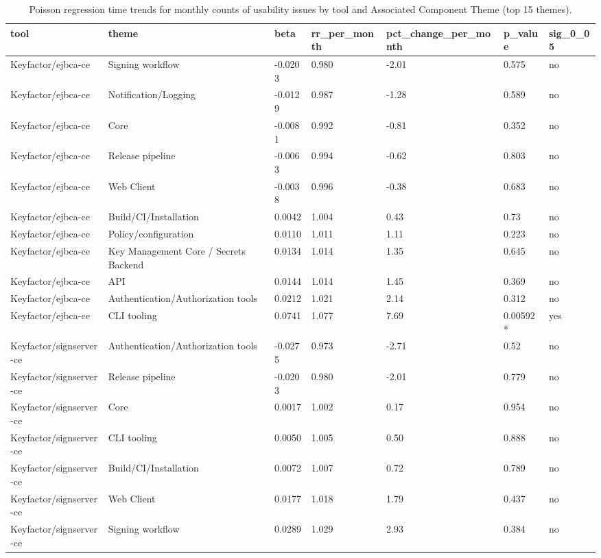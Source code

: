 \begin{table}[t]
\centering
\caption{Poisson regression time trends for monthly counts of usability issues by tool and Associated Component Theme (top 15 themes).}
\label{tab:poisson-associated_component_theme}
\scriptsize
\begin{tabular}{lllllll}
\hline
tool & theme & beta & rr\_per\_month & pct\_change\_per\_month & p\_value & sig\_0\_05 \\
\hline
Keyfactor/ejbca-ce & Signing workflow & -0.0203 & 0.980 & -2.01 & 0.575 & no \\
Keyfactor/ejbca-ce & Notification/Logging & -0.0129 & 0.987 & -1.28 & 0.589 & no \\
Keyfactor/ejbca-ce & Core & -0.0081 & 0.992 & -0.81 & 0.352 & no \\
Keyfactor/ejbca-ce & Release pipeline & -0.0063 & 0.994 & -0.62 & 0.803 & no \\
Keyfactor/ejbca-ce & Web Client & -0.0038 & 0.996 & -0.38 & 0.683 & no \\
Keyfactor/ejbca-ce & Build/CI/Installation & 0.0042 & 1.004 & 0.43 & 0.73 & no \\
Keyfactor/ejbca-ce & Policy/configuration & 0.0110 & 1.011 & 1.11 & 0.223 & no \\
Keyfactor/ejbca-ce & Key Management Core / Secrets Backend & 0.0134 & 1.014 & 1.35 & 0.645 & no \\
Keyfactor/ejbca-ce & API & 0.0144 & 1.014 & 1.45 & 0.369 & no \\
Keyfactor/ejbca-ce & Authentication/Authorization tools & 0.0212 & 1.021 & 2.14 & 0.312 & no \\
Keyfactor/ejbca-ce & CLI tooling & 0.0741 & 1.077 & 7.69 & 0.00592* & yes \\
Keyfactor/signserver-ce & Authentication/Authorization tools & -0.0275 & 0.973 & -2.71 & 0.52 & no \\
Keyfactor/signserver-ce & Release pipeline & -0.0203 & 0.980 & -2.01 & 0.779 & no \\
Keyfactor/signserver-ce & Core & 0.0017 & 1.002 & 0.17 & 0.954 & no \\
Keyfactor/signserver-ce & CLI tooling & 0.0050 & 1.005 & 0.50 & 0.888 & no \\
Keyfactor/signserver-ce & Build/CI/Installation & 0.0072 & 1.007 & 0.72 & 0.789 & no \\
Keyfactor/signserver-ce & Web Client & 0.0177 & 1.018 & 1.79 & 0.437 & no \\
Keyfactor/signserver-ce & Signing workflow & 0.0289 & 1.029 & 2.93 & 0.384 & no \\

\end{tabular}
\end{table}
